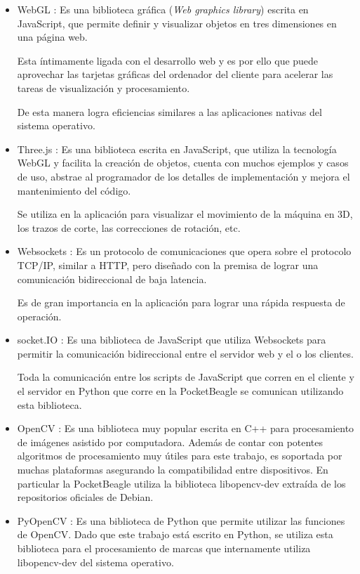 \begin{itemize}
{         También se utilizan bibliotecas de terceros para diferentes usos, escritas en este lenguaje, lo que permite reutilizar código.
      }
      \item{WebGL \citep{WEBSITE:webgl}: Es una biblioteca gráfica (\textit{Web graphics library}) escrita en JavaScript, que permite definir y visualizar objetos en tres dimensiones en una página web.\par
         Esta íntimamente ligada con el desarrollo web y es por ello que puede aprovechar las tarjetas gráficas del ordenador del cliente para acelerar las tareas de visualización y procesamiento.\par
         De esta manera logra eficiencias similares a las aplicaciones nativas del sistema operativo.
      }
      \item{Three.js \citep{WEBSITE:threejs}: Es una biblioteca escrita en JavaScript, que utiliza la tecnología WebGL y facilita la creación de objetos, cuenta con muchos ejemplos y casos de uso, abstrae al programador de los detalles de implementación y mejora el mantenimiento del código.\par
         Se utiliza en la aplicación para visualizar el movimiento de la máquina en 3D, los trazos de corte, las correcciones de rotación, etc.
      }
      \item{Websockets \citep{WEBSITE:websockets}: Es un protocolo de comunicaciones que opera sobre el protocolo TCP/IP, similar a HTTP, pero diseñado con la premisa de lograr una comunicación bidireccional de baja latencia.\par
         Es de gran importancia en la aplicación para lograr una rápida respuesta de operación.
      }
      \item{socket.IO \citep{WEBSITE:socketio}: Es una biblioteca de JavaScript que utiliza Websockets para permitir la comunicación bidireccional entre el servidor web y el o los clientes.\par
         Toda la comunicación entre los scripts de JavaScript que corren en el cliente y el servidor en Python que corre en la PocketBeagle se comunican utilizando esta biblioteca.
      }
   \item{OpenCV \citep{WEBSITE:opencv}: Es una biblioteca muy popular escrita en C++ para procesamiento de imágenes asistido por computadora.
         Además de contar con potentes algoritmos de procesamiento muy útiles para este trabajo, es soportada por muchas plataformas asegurando la compatibilidad entre dispositivos.
         En particular la PocketBeagle utiliza la biblioteca libopencv-dev extraída de los repositorios oficiales de Debian.
      }
   \item{PyOpenCV \citep{WEBSITE:pyopencv}: Es una biblioteca de Python que permite utilizar las funciones de OpenCV.
         Dado que este trabajo está escrito en Python, se utiliza esta biblioteca para el procesamiento de marcas que internamente utiliza libopencv-dev del sistema operativo.
      }
\end{itemize}

